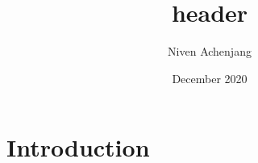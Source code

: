 \documentclass{article}
\title{header}
\author{Niven Achenjang}
\date{December 2020}
\begin{document}
\maketitle

\section{Introduction}
\end{document}
